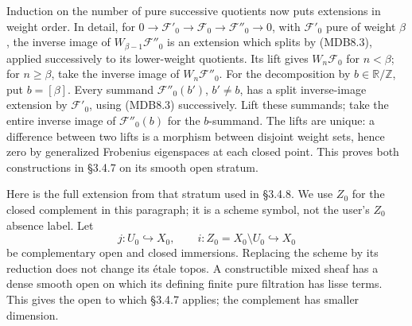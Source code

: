 \documentclass[
]{report}
\begin{document}
Induction on the number of pure successive quotients now puts extensions
in weight order. In detail, for
\(0\to\mathcal F'_0\to\mathcal F_0\to\mathcal F''_0\to0\), with
\(\mathcal F'_0\) pure of weight \(\beta\), the inverse image of
\(W_{\beta-1}\mathcal F''_0\) is an extension which splits by (MDB8.3),
applied successively to its lower-weight quotients. Its lift gives
\(W_n\mathcal F_0\) for \(n<\beta\); for \(n\geq\beta\), take the
inverse image of \(W_n\mathcal F''_0\). For the decomposition by
\(b\in\mathbb R/\mathbb Z\), put \(b=[\beta]\). Every summand
\(\mathcal F''_0(b')\), \(b'\neq b\), has a split inverse-image
extension by \(\mathcal F'_0\), using (MDB8.3) successively. Lift these
summands; take the entire inverse image of \(\mathcal F''_0(b)\) for the
\(b\)-summand. The lifts are unique: a difference between two lifts is a
morphism between disjoint weight sets, hence zero by generalized
Frobenius eigenspaces at each closed point. This proves both
constructions in §3.4.7 on its smooth open stratum.

Here is the full extension from that stratum used in §3.4.8. We use
\(Z_0\) for the closed complement in this paragraph; it is a scheme
symbol, not the user's \(Z_0\) absence label. Let \[
j:U_0\hookrightarrow X_0,\qquad i:Z_0=X_0\setminus U_0\hookrightarrow X_0
\tag{MDB8.3a}
\] be complementary open and closed immersions. Replacing the scheme by
its reduction does not change its étale topos. A constructible mixed
sheaf has a dense smooth open on which its defining finite pure
filtration has lisse terms. This gives the open to which §3.4.7 applies;
the complement has smaller dimension.
\end{document}
